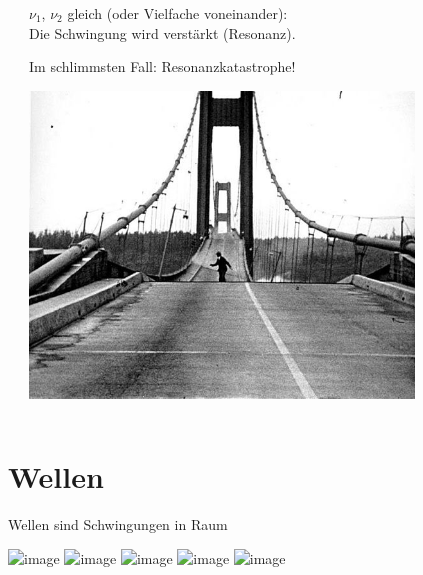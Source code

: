 \documentclass{beamer}
\begin{document}
\begin{frame}
\begin{columns}[c]
\begin{column}{3cm}
\end{column}

\begin{column}{7cm}


\(\nu_1\), \(\nu_2\) gleich (oder Vielfache voneinander): \\
Die Schwingung wird verstärkt (Resonanz). \\[0.5 cm]

\pause

Im schlimmsten Fall: Resonanzkatastrophe!

\begin{center}
\includegraphics[width=0.8\textwidth]{tacoma_bridge.jpg}
\end{center}

\end{column}

\end{columns}

\end{frame}







\section{Wellen}




\begin{frame}{Wellen sind Schwingungen in Raum}

\begin{center}
    \includegraphics<1>[width=\textwidth]{wellen1.png}
    \includegraphics<2>[width=\textwidth]{wellen2.png}
        \includegraphics<3>[width=\textwidth]{wellen3.png}
    \includegraphics<4>[width=\textwidth]{wellen4.png}
    \includegraphics<5>[width=\textwidth]{wellen5.png}
\end{center}
    
\end{frame}
\end{document}
